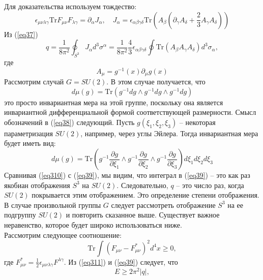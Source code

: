 \documentclass[12pt]{article}
\theoremstyle{definition}
\begin{document}
Для доказательства используем тождество:
\begin{equation}\label{eq37}
    \epsilon_{\mu\nu\lambda\gamma}\text{Tr}F_{\mu\nu}F_{\lambda\gamma}=\partial_\alpha J_\alpha,\quad J_\alpha=\epsilon_{\alpha\beta\gamma\delta}\text{Tr}\left(A_\beta\left(\partial_\gamma A_\delta+\frac{2}{3}A_\gamma A_\delta\right)\right)
\end{equation}
Из (\ref{eq37})
\begin{equation}\label{eq39}
    q=\frac{1}{8\pi^2}\oint_{S^3}J_\alpha d^3\sigma^\alpha=\frac{1}{8\pi^2}\frac{4}{3}\epsilon_{\alpha\beta\gamma\delta}\oint\text{Tr}(A_\beta A_\gamma A_\delta)d^3\sigma_\alpha,
\end{equation}
где
\begin{equation}
    A_\mu=g^{-1}(x)\partial_\mu g(x)
\end{equation}
Рассмотрим случай $G=SU(2)$. В этом случае получается, что
\begin{equation}\label{eq38}
    d\mu(g)=\text{Tr}(g^{-1}dg\wedge g^{-1}dg\wedge g^{-1}dg)
\end{equation}
это просто инвариантная мера на этой группе, поскольку она является инвариантной дифференциальной формой соответствующей размерности. Смысл обозначений в (\ref{eq38}) следующий. Пусть $g(\xi_1,\xi_2,\xi_3)$ -- некоторая параметризация $SU(2)$, например, через углы Эйлера. Тогда инвариантная мера будет иметь вид:
\begin{equation}\label{eq310}
    d\mu(g)=\text{Tr}\left(g^{-1}\frac{\partial g}{\partial\xi_1}\wedge g^{-1}\frac{\partial g}{\partial\xi_2}\wedge g^{-1}\frac{\partial g}{\partial\xi_3}\right)d\xi_1d\xi_2d\xi_3
\end{equation}
Сравнивая (\ref{eq310}) с (\ref{eq39}), мы видим, что интеграл в (\ref{eq39}) -- это как раз якобиан отображения $S^3$ на $SU(2)$. Следовательно, $q$ -- это число раз, когда $SU(2)$ покрывается этим отображением. Это определение степени отображения. В случае произвольной группы $G$ следует рассмотреть отображение $S^3$ на ее подгруппу $SU(2)$ и повторить сказанное выше. Существует важное неравенство, которое будет широко использоваться ниже.\\
Рассмотрим следующее соотношение:
\begin{equation}\label{eq311}
    \text{Tr}\int(F_{\mu\nu}-F^*_{\mu\nu})^2d^4x\geq0,
\end{equation}
где $F^*_{\mu\nu}=\frac{1}{2}\epsilon_{\mu\nu\lambda\gamma}F^{\lambda\gamma}$. Из (\ref{eq311}) и (\ref{eq39}) следует, что
\begin{equation}\label{eq312}
    E\geq2\pi^2|q|,
\end{equation}
\end{document}
